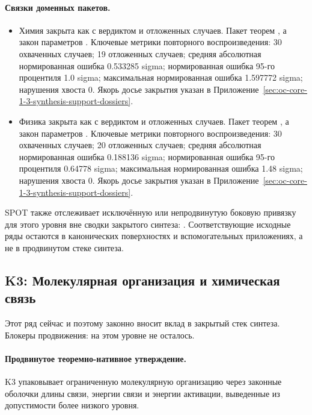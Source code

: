 \paragraph{Связки доменных пакетов.}
\begin{itemize}[leftmargin=1.6em,nosep]
\item Химия закрыта как  с вердиктом  и  отложенных случаев. Пакет теорем , а закон параметров . Ключевые метрики повторного воспроизведения: 30 охваченных случаев; 19 отложенных случаев; средняя абсолютная нормированная ошибка 0.533285 sigma; нормированная ошибка 95-го процентиля 1.0 sigma; максимальная нормированная ошибка 1.597772 sigma; нарушения хвоста 0. Якорь досье закрытия указан в Приложение~\ref{sec:oc-core-1-3-synthesis-support-dossiers}.
\item Физика закрыта как  с вердиктом  и  отложенных случаев. Пакет теорем , а закон параметров . Ключевые метрики повторного воспроизведения: 30 охваченных случаев; 20 отложенных случаев; средняя абсолютная нормированная ошибка 0.188136 sigma; нормированная ошибка 95-го процентиля 0.64778 sigma; максимальная нормированная ошибка 1.48 sigma; нарушения хвоста 0. Якорь досье закрытия указан в Приложение~\ref{sec:oc-core-1-3-synthesis-support-dossiers}.
\end{itemize}
SPOT также отслеживает  исключённую или непродвинутую боковую привязку для этого уровня вне сводки закрытого синтеза: . Соответствующие исходные ряды остаются в канонических поверхностях и вспомогательных приложениях, а не в продвинутом стеке синтеза.

\subsection{K3: Молекулярная организация и химическая связь}
\label{sec:oc-core-1-3-synthesis-k3}
Этот ряд сейчас  и поэтому законно вносит вклад в закрытый стек синтеза.
Блокеры продвижения: на этом уровне не осталось.

\paragraph{Продвинутое теоремно-нативное утверждение.}
K3 упаковывает ограниченную молекулярную организацию через законные оболочки длины связи, энергии связи и энергии активации, выведенные из допустимости более низкого уровня.

